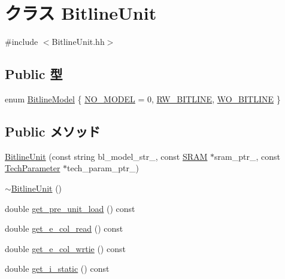 \hypertarget{classBitlineUnit}{
\section{クラス BitlineUnit}
\label{classBitlineUnit}
}


{\ttfamily \#include $<$BitlineUnit.hh$>$}\subsection*{Public 型}
\begin{DoxyCompactItemize}
\item 
enum \hyperlink{classBitlineUnit_aa621ee4b7cf946b1f26e4c1c25db771d}{BitlineModel} \{ \hyperlink{classBitlineUnit_aa621ee4b7cf946b1f26e4c1c25db771dabab57b6e2c553e4d983f415a1f4ea75b}{NO\_\-MODEL} =  0, 
\hyperlink{classBitlineUnit_aa621ee4b7cf946b1f26e4c1c25db771da297a48ae5d3c13086d9ab879b81d1f51}{RW\_\-BITLINE}, 
\hyperlink{classBitlineUnit_aa621ee4b7cf946b1f26e4c1c25db771da2b4155cc77829f8101579456212ce818}{WO\_\-BITLINE}
 \}
\end{DoxyCompactItemize}
\subsection*{Public メソッド}
\begin{DoxyCompactItemize}
\item 
\hyperlink{classBitlineUnit_a5c6a683eb8adcc3e9234c773a667b49e}{BitlineUnit} (const string bl\_\-model\_\-str\_\-, const \hyperlink{classSRAM}{SRAM} $\ast$sram\_\-ptr\_\-, const \hyperlink{classTechParameter}{TechParameter} $\ast$tech\_\-param\_\-ptr\_\-)
\item 
\hyperlink{classBitlineUnit_a562ef5642fe773aee1454bba8b5fefc0}{$\sim$BitlineUnit} ()
\item 
double \hyperlink{classBitlineUnit_a9cc5aacc0ad37d1666dd8397d3369723}{get\_\-pre\_\-unit\_\-load} () const 
\item 
double \hyperlink{classBitlineUnit_a665e8335005e4c818305cbdbcaa3e5a4}{get\_\-e\_\-col\_\-read} () const 
\item 
double \hyperlink{classBitlineUnit_a7936403fd082763cb36ad6de7147cf4c}{get\_\-e\_\-col\_\-wrtie} () const 
\item 
double \hyperlink{classBitlineUnit_af4ce13e52cccc034f4f0bb0f0a6c9468}{get\_\-i\_\-static} () const 
\end{DoxyCompactItemize}
